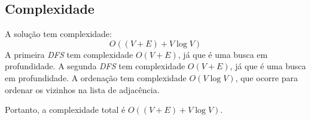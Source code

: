 \documentclass[12pt, letterpaper]{article}
\begin{document}
        \subsection{Complexidade}
            A solução tem complexidade:
            $$ O((V + E) + V\log{V}) $$
            A primeira \emph{DFS} tem complexidade $O(V + E)$, já que é uma busca em profundidade. A segunda \emph{DFS} tem complexidade $O(V + E)$, já que é uma busca em profundidade. A ordenação tem complexidade $O(V\log{V})$, que ocorre para ordenar os vizinhos na lista de adjacência.

            Portanto, a complexidade total é $O((V + E) + V\log{V})$.
\end{document}
